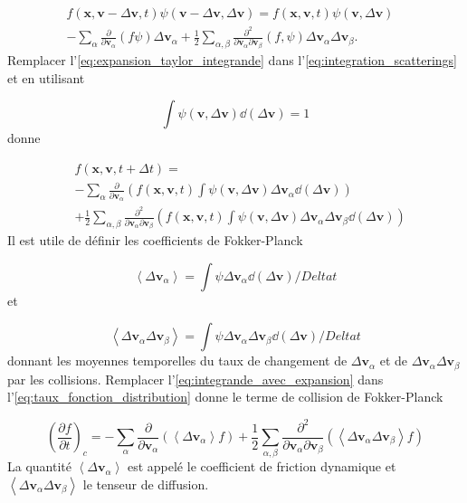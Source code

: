 \documentclass[main.tex]{subfiles}
\begin{document}
\begin{align}
	f \left( \bm{x}, \bm{v} - \Delta  \bm{v}, t\right) \psi \left(\bm{v} - \Delta \bm{v}, \Delta \bm{v} \right) = f \left( \bm{x}, \bm{v}, t\right) \psi \left(\bm{v}, \Delta \bm{v} \right)	& \nonumber\\
	- \sum_\alpha \frac{\partial}{\partial \bm{v}_\alpha} \left( f \psi \right) \Delta \bm{v}_\alpha + \frac{1}{2} \sum_{\alpha, \beta} \frac{\partial^2}{\partial \bm{v}_\alpha \partial \bm{v}_\beta} \left( f, \psi \right) \Delta \bm{v}_\alpha \Delta \bm{v}_\beta.&
	\label{eq:expansion_taylor_integrande}
\end{align}
Remplacer l'\autoref{eq:expansion_taylor_integrande} dans l'\autoref{eq:integration_scatterings} et en utilisant

\[
	\int \psi \left( \bm{v}, \Delta \bm{v} \right) \dd \left( \Delta \bm{v} \right) = 1
\]
donne

\begin{align}
	&f \left( \bm{x}, \bm{v}, t + \Delta t\right) = \nonumber\\
	& - \sum_\alpha \frac{\partial}{\partial \bm{v}_\alpha} \left( f \left( \bm{x}, \bm{v}, t \right) \int \psi \left( \bm{v}, \Delta \bm{v}\right) \Delta \bm{v}_\alpha \dd \left( \Delta \bm{v} \right) \right) \nonumber\\
	&+ \frac{1}{2} \sum_{\alpha, \beta} \frac{\partial^2}{\partial \bm{v}_\alpha \partial \bm{v}_\beta} \left( f \left( \bm{x}, \bm{v}, t\right) \int \psi \left( \bm{v}, \Delta \bm{v}\right) \Delta \bm{v}_\alpha \Delta \bm{v}_\beta \dd \left( \Delta \bm{v} \right) \right)
	\label{eq:integrande_avec_expansion}
\end{align}
Il est utile de définir les coefficients de Fokker-Planck

\[
	\left\langle \Delta \bm{v}_\alpha \right\rangle = \int \psi \Delta \bm{v}_\alpha \dd \left( \Delta \bm{v} \right) / Delta t
\]
et

\[
	\left\langle \Delta \bm{v}_\alpha \Delta \bm{v}_\beta \right\rangle = \int \psi \Delta \bm{v}_\alpha \Delta \bm{v}_\beta \dd \left( \Delta \bm{v} \right) / Delta t
\]
donnant les moyennes temporelles du taux de changement de \( \Delta \bm{v}_\alpha  \) et de \( \Delta \bm{v}_\alpha \Delta \bm{v}_\beta \) par les collisions.
Remplacer l'\autoref{eq:integrande_avec_expansion} dans l'\autoref{eq:taux_fonction_distribution} donne le terme de collision de Fokker-Planck

\begin{equation}
	\left( \frac{\partial f}{\partial t} \right)_c =  - \sum_\alpha \frac{\partial}{\partial \bm{v}_\alpha}  \left( \left\langle \Delta \bm{v}_\alpha \right\rangle f \right) + \frac{1}{2} \sum_{\alpha, \beta} \frac{\partial^2}{\partial \bm{v}_\alpha \partial \bm{v}_\beta} \left( \left\langle \Delta \bm{v}_\alpha \Delta \bm{v}_\beta \right\rangle f \right)
	\label{eq:terme_collision_fokker_planck}
\end{equation}
La quantité \( \left\langle \Delta \bm{v}_\alpha \right\rangle \) est appelé le coefficient de friction dynamique et \( \left\langle \Delta \bm{v}_\alpha \Delta \bm{v}_\beta \right\rangle \) le tenseur de diffusion.
\end{document}
